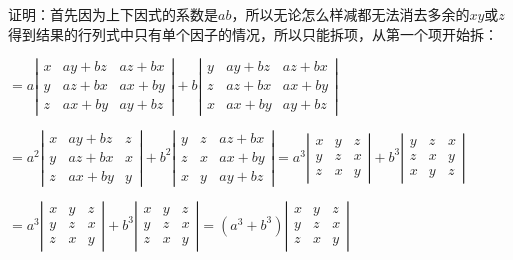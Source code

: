 证明：首先因为上下因式的系数是$ab$，所以无论怎么样减都无法消去多余的$xy$或$z$得到结果的行列式中只有单个因子的情况，所以只能拆项，从第一个项开始拆：

$=a\left|\begin{array}{ccc}
    x & ay+bz & az+bx \\
    y & az+bx & ax+by \\
    z & ax+by & ay+bz
\end{array}\right|+b\left|\begin{array}{ccc}
    y & ay+bz & az+bx \\
    z & az+bx & ax+by \\
    x & ax+by & ay+bz
\end{array}\right|$

$=a^2\left|\begin{array}{ccc}
    x & ay+bz & z \\
    y & az+bx & x \\
    z & ax+by & y
\end{array}\right|+b^2\left|\begin{array}{ccc}
    y & z & az+bx \\
    z & x & ax+by \\
    x & y & ay+bz
\end{array}\right|=a^3\left|\begin{array}{ccc}
    x & y & z \\
    y & z & x \\
    z & x & y
\end{array}\right|+b^3\left|\begin{array}{ccc}
    y & z & x \\
    z & x & y \\
    x & y & z
\end{array}\right|$

$=a^3\left|\begin{array}{ccc}
    x & y & z \\
    y & z & x \\
    z & x & y
\end{array}\right|+b^3\left|\begin{array}{ccc}
    x & y & z \\
    y & z & x \\
    z & x & y
\end{array}\right|=(a^3+b^3)\left|\begin{array}{ccc}
    x & y & z \\
    y & z & x \\
    z & x & y
\end{array}\right|
$


